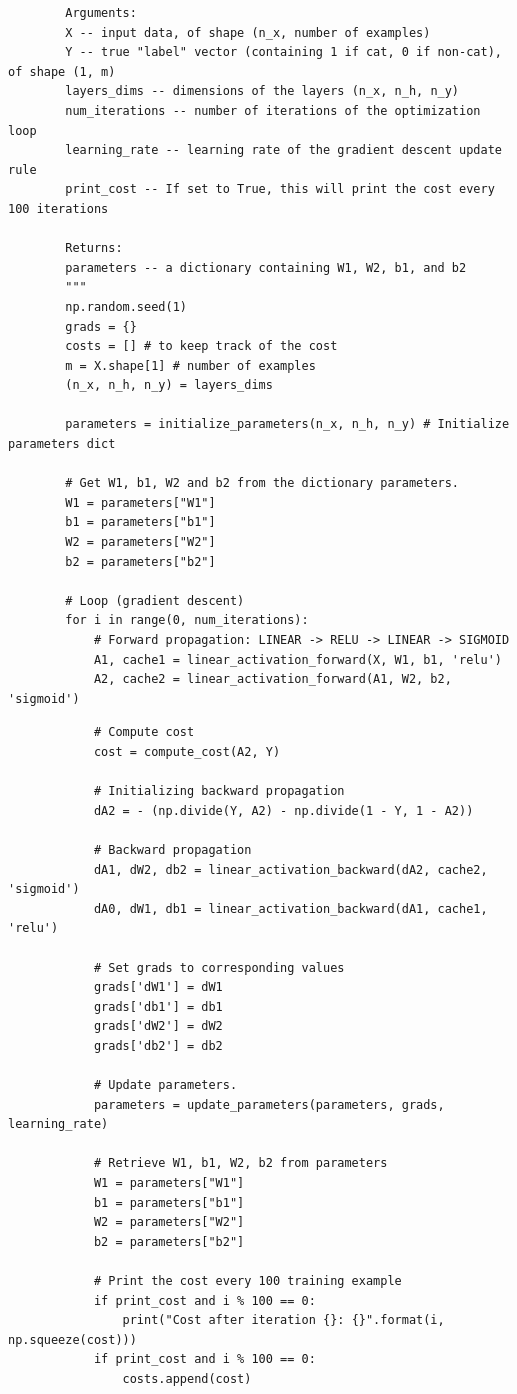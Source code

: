\documentclass[11pt, a4paper]{article}
\begin{document}
\begin{spacing}{1.1}
\begin{lstlisting}
		Arguments:
		X -- input data, of shape (n_x, number of examples)
		Y -- true "label" vector (containing 1 if cat, 0 if non-cat), of shape (1, m)
		layers_dims -- dimensions of the layers (n_x, n_h, n_y)
		num_iterations -- number of iterations of the optimization loop
		learning_rate -- learning rate of the gradient descent update rule
		print_cost -- If set to True, this will print the cost every 100 iterations 
		
		Returns:
		parameters -- a dictionary containing W1, W2, b1, and b2
		"""
		np.random.seed(1)
		grads = {}
		costs = [] # to keep track of the cost
		m = X.shape[1] # number of examples
		(n_x, n_h, n_y) = layers_dims
		
		parameters = initialize_parameters(n_x, n_h, n_y) # Initialize parameters dict
		
		# Get W1, b1, W2 and b2 from the dictionary parameters.
		W1 = parameters["W1"]
		b1 = parameters["b1"]
		W2 = parameters["W2"]
		b2 = parameters["b2"]
		
		# Loop (gradient descent)
		for i in range(0, num_iterations):
			# Forward propagation: LINEAR -> RELU -> LINEAR -> SIGMOID
			A1, cache1 = linear_activation_forward(X, W1, b1, 'relu')
			A2, cache2 = linear_activation_forward(A1, W2, b2, 'sigmoid') \end{lstlisting} \newpage
			
	\begin{lstlisting}
			# Compute cost
			cost = compute_cost(A2, Y)
			
			# Initializing backward propagation
			dA2 = - (np.divide(Y, A2) - np.divide(1 - Y, 1 - A2))
			
			# Backward propagation
			dA1, dW2, db2 = linear_activation_backward(dA2, cache2, 'sigmoid')
			dA0, dW1, db1 = linear_activation_backward(dA1, cache1, 'relu')
			
			# Set grads to corresponding values
			grads['dW1'] = dW1
			grads['db1'] = db1
			grads['dW2'] = dW2
			grads['db2'] = db2
			
			# Update parameters.
			parameters = update_parameters(parameters, grads, learning_rate)
			
			# Retrieve W1, b1, W2, b2 from parameters
			W1 = parameters["W1"]
			b1 = parameters["b1"]
			W2 = parameters["W2"]
			b2 = parameters["b2"]
			
			# Print the cost every 100 training example
			if print_cost and i % 100 == 0:
				print("Cost after iteration {}: {}".format(i, np.squeeze(cost)))
			if print_cost and i % 100 == 0:
				costs.append(cost)
		

\end{lstlisting}
\end{spacing}
\end{document}

